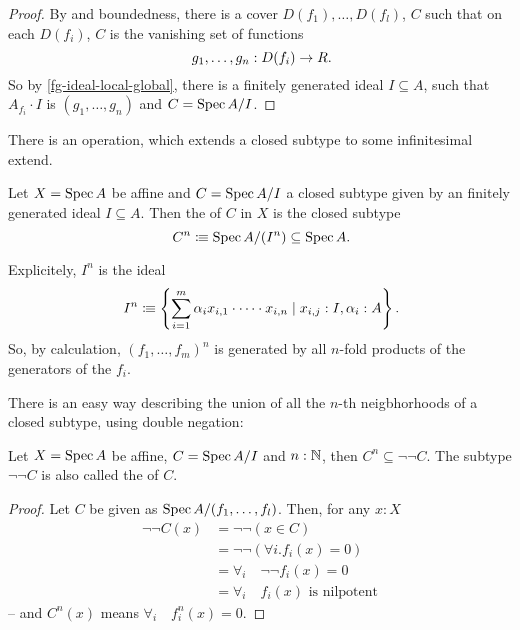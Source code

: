 \begin{proof}
  By  and boundedness,
  there is a cover $D(f_1),\dots,D(f_l)$, $C$ such that
  on each $D(f_i)$, $C$ is the vanishing set of functions
  \[ g_1,\dots,g_n:D(f_i)\to R\rlap{.} \]
  So by \cref{fg-ideal-local-global}, there is a finitely generated ideal $I\subseteq A$,
  such that $A_{f_i}\cdot I$ is $(g_1,\dots,g_n)$
  and $C=\operatorname{Spec} A/I$.
\end{proof}

There is an operation, which extends a closed subtype to some infinitesimal extend.

\begin{definition}%
  \label{affine-n-th-inf-neighborhood}
  Let $X=\operatorname{Spec} A$ be affine and $C=\operatorname{Spec} A/I$
  a closed subtype given by an finitely generated ideal $I\subseteq A$.
  Then the  of $C$ in $X$ is the closed subtype
  \[
    C^n\colonequiv \Spec A/(I^n) \subseteq \Spec A\rlap{.}
  \]
\end{definition}

Explicitely, $I^n$ is the ideal
\[
  I^n\colonequiv
  \left\{
    \sum_{i=1}^m\alpha_i x_{i,1}\cdot\cdots\cdot x_{i,n}
    \mid x_{i,j}:I, \alpha_i:A
  \right\}\rlap{.}
\]
So, by calculation, $(f_1,\dots,f_m)^n$
is generated by all $n$-fold products of the generators of the $f_i$.

There is an easy way describing the union of all the $n$-th neigbhorhoods
of a closed subtype, using double negation:

\begin{lemma}%
  \label{affine-n-th-inf-neighborhood-formal}
  Let $X=\operatorname{Spec} A$ be affine, $C=\operatorname{Spec} A/I$ and $n:\mathbb{N}$,
  then $C^n\subseteq \neg\neg C$.
  The subtype $\neg\neg C$ is also called the  of $C$.
\end{lemma}

\begin{proof}
  Let $C$ be given as $\operatorname{Spec} A/(f_1,\dots,f_l)$.
  Then, for any $x:X$
  \begin{align*}
    \neg\neg C(x) &= \neg \neg (x\in C) \\
                  &= \neg\neg (\forall i. f_i(x)=0) \\
                  &= \forall_i \quad\neg\neg f_i(x)=0 \\
    &= \forall_i \quad f_i(x)\text{ is nilpotent}
  \end{align*}
  -- and $C^n(x)$ means $\forall_i \quad f^n_i(x)=0$.
\end{proof}

